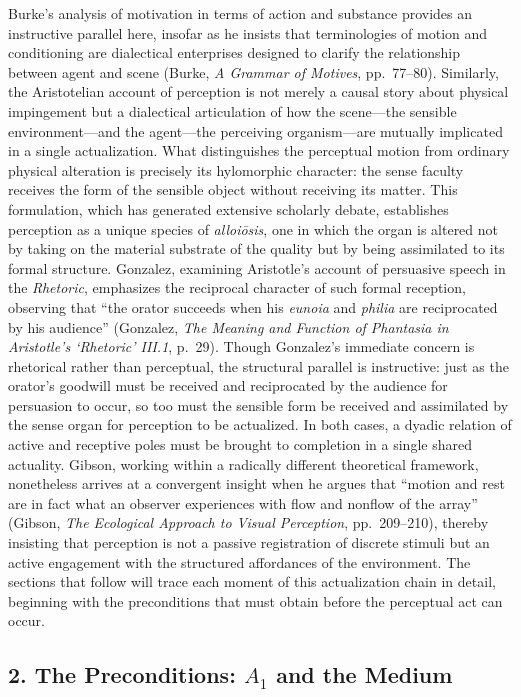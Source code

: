 \documentclass[12pt]{article}
\begin{document}
Burke's analysis of motivation in terms of action and substance provides an instructive parallel here, insofar as he insists that terminologies of motion and conditioning are dialectical enterprises designed to clarify the relationship between agent and scene (Burke, \textit{A Grammar of Motives}, pp.~77--80). Similarly, the Aristotelian account of perception is not merely a causal story about physical impingement but a dialectical articulation of how the scene---the sensible environment---and the agent---the perceiving organism---are mutually implicated in a single actualization. What distinguishes the perceptual motion from ordinary physical alteration is precisely its hylomorphic character: the sense faculty receives the form of the sensible object without receiving its matter. This formulation, which has generated extensive scholarly debate, establishes perception as a unique species of \textit{alloiōsis}, one in which the organ is altered not by taking on the material substrate of the quality but by being assimilated to its formal structure. Gonzalez, examining Aristotle's account of persuasive speech in the \textit{Rhetoric}, emphasizes the reciprocal character of such formal reception, observing that ``the orator succeeds when his \textit{eunoia} and \textit{philia} are reciprocated by his audience'' (Gonzalez, \textit{The Meaning and Function of Phantasia in Aristotle's `Rhetoric' III.1}, p.~29). Though Gonzalez's immediate concern is rhetorical rather than perceptual, the structural parallel is instructive: just as the orator's goodwill must be received and reciprocated by the audience for persuasion to occur, so too must the sensible form be received and assimilated by the sense organ for perception to be actualized. In both cases, a dyadic relation of active and receptive poles must be brought to completion in a single shared actuality. Gibson, working within a radically different theoretical framework, nonetheless arrives at a convergent insight when he argues that ``motion and rest are in fact what an observer experiences with flow and nonflow of the array'' (Gibson, \textit{The Ecological Approach to Visual Perception}, pp.~209--210), thereby insisting that perception is not a passive registration of discrete stimuli but an active engagement with the structured affordances of the environment. The sections that follow will trace each moment of this actualization chain in detail, beginning with the preconditions that must obtain before the perceptual act can occur.

\subsection*{2. The Preconditions: $A_1$ and the Medium}
\end{document}
